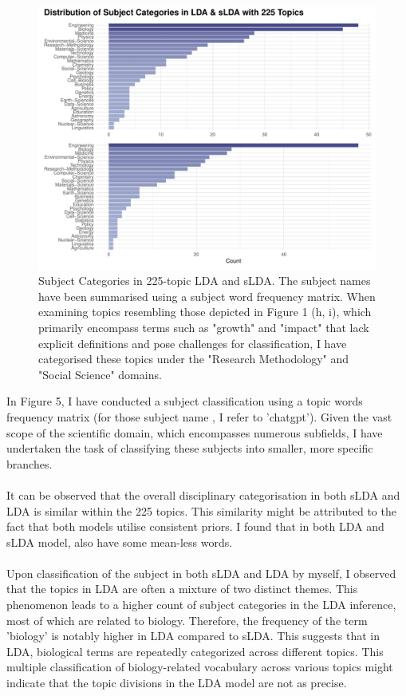 \documentclass[12pt,twoside]{article}
\begin{document}
\begin{figure}[h]
    \centering
    \includegraphics[width=15cm]{./figures/subject225}
    \caption{Subject Categories in 225-topic LDA and sLDA. The subject names have been summarised using a subject word frequency matrix. When examining topics resembling those depicted in Figure 1 (h, i), which primarily encompass terms such as "growth" and "impact" that lack explicit definitions and pose challenges for classification, I have categorised these topics under the "Research Methodology" and "Social Science" domains. }
\end{figure}

In Figure 5, I have conducted a subject classification using a topic words frequency matrix (for those subject name , I refer to 'chatgpt'). Given the vast scope of the scientific domain, which encompasses numerous subfields, I have undertaken the task of classifying these subjects into smaller, more specific branches.\\\\

It can be observed that the overall disciplinary categorisation in both sLDA and LDA is similar within the 225 topics. This similarity might be attributed to the fact that both models utilise consistent priors. I found that in both LDA and sLDA model, also have some mean-less words. \\\\

Upon classification of the subject in both sLDA and LDA by myself, I observed that the topics in LDA are often a mixture of two distinct themes. This phenomenon leads to a higher count of subject categories in the LDA inference, most of which are related to biology. Therefore, the frequency of the term 'biology' is notably higher in LDA compared to sLDA. This suggests that in LDA, biological terms are repeatedly categorized across different topics. This multiple classification of biology-related vocabulary across various topics might indicate that the topic divisions in the LDA model are not as precise.\\\\
\end{document}
